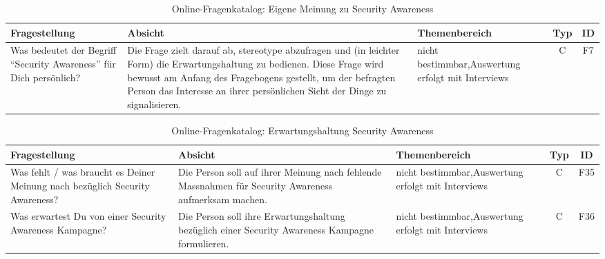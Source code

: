 \documentclass[../../main.tex]{subfiles}
\begin{document}

\sloppy 

\begin{table}[H]
\tablefontsize	
\centering
\caption{Online-Fragenkatalog: Eigene Meinung zu Security Awareness}
\label{Eigene Meinung zu Security Awareness}
\begin{tabular}{ |p{5.5cm}|p{5.5cm}|p{2.5cm}|c|c|}

\hline
\tableheaderbgcolor
\textbf{Fragestellung} & \textbf{Absicht} & \textbf{Themenbereich} & \textbf{Typ} & \textbf{ID}\\ 
\hline
Was bedeutet der Begriff "`Security Awareness"' für Dich persönlich? &  Die Frage zielt darauf ab, stereotype abzufragen und (in leichter Form) die Erwartungshaltung zu bedienen. Diese Frage wird bewusst am Anfang des Fragebogens gestellt, um der befragten Person das Interesse an ihrer persönlichen Sicht der Dinge zu signalisieren. & nicht bestimmbar,\newline Auswertung erfolgt mit Interviews & C & F7 \\
\hline

\end{tabular}
\end{table}


\sloppy 

\begin{table}[H]
\tablefontsize	
\centering
\caption{Online-Fragenkatalog: Erwartungshaltung Security Awareness}
\label{Erwartungshaltung Security Awareness}
\begin{tabular}{ |p{5.5cm}|p{5.5cm}|p{2.5cm}|c|c|}

\hline
\tableheaderbgcolor
\textbf{Fragestellung} & \textbf{Absicht} & \textbf{Themenbereich} & \textbf{Typ} & \textbf{ID}\\ 
\hline
Was fehlt / was braucht es Deiner Meinung nach bezüglich Security Awareness? & Die Person soll auf ihrer Meinung nach fehlende Massnahmen für Security Awareness aufmerksam machen. & nicht bestimmbar,\newline Auswertung erfolgt mit Interviews & C & F35 \\
\hline

Was erwartest Du von einer Security Awareness Kampagne? & Die Person soll ihre Erwartungshaltung bezüglich einer Security Awareness Kampagne formulieren. & nicht bestimmbar,\newline Auswertung erfolgt mit Interviews & C & F36 \\
\hline

\end{tabular}
\end{table}
\end{document}
